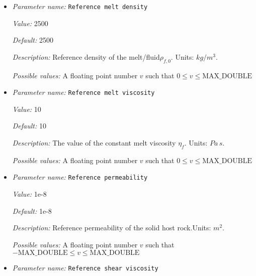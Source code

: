 \begin{itemize}
{\it Description:} The value of the constant bulk viscosity $\xi_0$ of the solid matrix. This viscosity may be modified by both temperature and porosity dependencies. Units: $Pa \, s$.


{\it Possible values:} A floating point number $v$ such that $0 \leq v \leq \text{MAX\_DOUBLE}$
\item {\it Parameter name:} {\tt Reference melt density}
\label{parameters:Material model/Melt simple/Reference melt density}
\label{parameters:Material_20model/Melt_20simple/Reference_20melt_20density}


{\it Value:} 2500


{\it Default:} 2500


{\it Description:} Reference density of the melt/fluid$\rho_{f,0}$. Units: $kg/m^3$.


{\it Possible values:} A floating point number $v$ such that $0 \leq v \leq \text{MAX\_DOUBLE}$
\item {\it Parameter name:} {\tt Reference melt viscosity}
\label{parameters:Material model/Melt simple/Reference melt viscosity}
\label{parameters:Material_20model/Melt_20simple/Reference_20melt_20viscosity}


{\it Value:} 10


{\it Default:} 10


{\it Description:} The value of the constant melt viscosity $\eta_f$. Units: $Pa \, s$.


{\it Possible values:} A floating point number $v$ such that $0 \leq v \leq \text{MAX\_DOUBLE}$
\item {\it Parameter name:} {\tt Reference permeability}
\label{parameters:Material model/Melt simple/Reference permeability}
\label{parameters:Material_20model/Melt_20simple/Reference_20permeability}


{\it Value:} 1e-8


{\it Default:} 1e-8


{\it Description:} Reference permeability of the solid host rock.Units: $m^2$.


{\it Possible values:} A floating point number $v$ such that $-\text{MAX\_DOUBLE} \leq v \leq \text{MAX\_DOUBLE}$
\item {\it Parameter name:} {\tt Reference shear viscosity}
\label{parameters:Material model/Melt simple/Reference shear viscosity}
\label{parameters:Material_20model/Melt_20simple/Reference_20shear_20viscosity}



\end{itemize}
